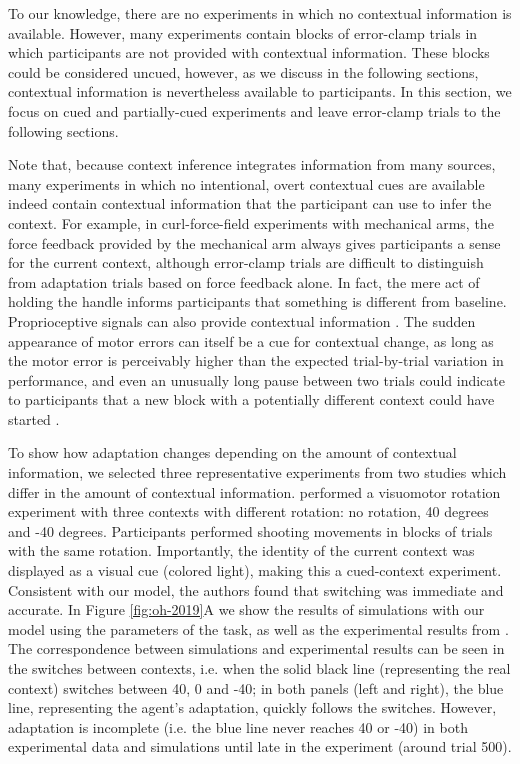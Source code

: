 \documentclass[a4paper,doc,floatsintext,natbib]{apa6}
\def \fref #1{Figure \ref{#1}}     %
\begin{document}
To our knowledge, there are no experiments in which no contextual information is available. However, many experiments \citep[e.g.][]{Huang_Persistence_2009,Brennan_Decay_2015,Smith_Interacting_2006} contain blocks of error-clamp trials in which participants are not provided with contextual information. These blocks could be considered uncued, however, as we discuss in the following sections, contextual information is nevertheless available to participants. In this section, we focus on cued and partially-cued experiments and leave error-clamp trials to the following sections.

Note that, because context inference integrates information from many sources, many experiments in which no intentional, overt contextual cues are available indeed contain contextual information that the participant can use to infer the context. For example, in curl-force-field experiments with mechanical arms, the force feedback provided by the mechanical arm always gives participants a sense for the current context, although error-clamp trials are difficult to distinguish from adaptation trials based on force feedback alone. In fact, the mere act of holding the handle informs participants that something is different from baseline. Proprioceptive signals can also provide contextual information \cite{Dizio_Motor_1995,Shadmehr_Adaptive_1994}. The sudden appearance of motor errors can itself be a cue for contextual change, as long as the motor error is perceivably higher than the expected trial-by-trial variation in performance, and even an unusually long pause between two trials could indicate to participants that a new block with a potentially different context could have started \cite[e.g.][]{Ethier_Spontaneous_2008}.

To show how adaptation changes depending on the amount of contextual information, we selected three representative experiments from two studies \cite{Kim_Neural_2015,Oh_Minimizing_2019} which differ in the amount of contextual information. \cite{Kim_Neural_2015} performed a visuomotor rotation experiment with three contexts with different rotation: no rotation, 40 degrees and -40 degrees. Participants performed shooting movements in blocks of trials with the same rotation. Importantly, the identity of the current context was displayed as a visual cue (colored light), making this a cued-context experiment. Consistent with our model, the authors found that switching was immediate and accurate. In \fref{fig:oh-2019}A we show the results of simulations with our model using the parameters of the task, as well as the experimental results from \cite{Kim_Neural_2015}. The correspondence between simulations and experimental results can be seen in the switches between contexts, i.e. when the solid black line (representing the real context) switches between 40, 0 and -40; in both panels (left and right), the blue line, representing the agent's adaptation, quickly follows the switches. However, adaptation is incomplete (i.e. the blue line never reaches 40 or -40) in both experimental data and simulations until late in the experiment (around trial 500).
\end{document}
